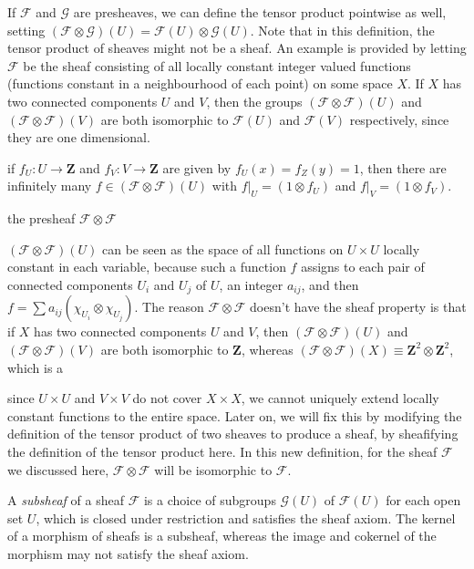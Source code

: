 \begin{example}
    If $\mathcal{F}$ and $\mathcal{G}$ are presheaves, we can define the tensor product pointwise as well, setting $(\mathcal{F} \otimes \mathcal{G})(U) = \mathcal{F}(U) \otimes \mathcal{G}(U)$. Note that in this definition, the tensor product of sheaves might not be a sheaf. An example is provided by letting $\mathcal{F}$ be the sheaf consisting of all locally constant integer valued functions (functions constant in a neighbourhood of each point) on some space $X$. If $X$ has two connected components $U$ and $V$, then the groups $(\mathcal{F} \otimes \mathcal{F})(U)$ and $(\mathcal{F} \otimes \mathcal{F})(V)$ are both isomorphic to $\mathcal{F}(U)$ and $\mathcal{F}(V)$ respectively, since they are one dimensional.

    if $f_U: U \to \mathbf{Z}$ and $f_V: V \to \mathbf{Z}$ are given by $f_U(x) = f_Z(y) = 1$, then there are infinitely many $f \in (\mathcal{F} \otimes \mathcal{F})(U)$ with $f|_U = (1 \otimes f_U)$ and $f|_V = (1 \otimes f_V)$.

    the presheaf $\mathcal{F} \otimes \mathcal{F}$

    $(\mathcal{F} \otimes \mathcal{F})(U)$ can be seen as the space of all functions on $U \times U$ locally constant in each variable, because such a function $f$ assigns to each pair of connected components $U_i$ and $U_j$ of $U$, an integer $a_{ij}$, and then $f = \sum a_{ij} (\chi_{U_i} \otimes \chi_{U_j})$. The reason $\mathcal{F} \otimes \mathcal{F}$ doesn't have the sheaf property is that if $X$ has two connected components $U$ and $V$, then $(\mathcal{F} \otimes \mathcal{F})(U)$ and $(\mathcal{F} \otimes \mathcal{F})(V)$ are both isomorphic to $\mathbf{Z}$, whereas $(\mathcal{F} \otimes \mathcal{F})(X) \equiv \mathbf{Z}^2 \otimes \mathbf{Z}^2$, which is a 

    since $U \times U$ and $V \times V$ do not cover $X \times X$, we cannot uniquely extend locally constant functions to the entire space. Later on, we will fix this by modifying the definition of the tensor product of two sheaves to produce a sheaf, by sheafifying the definition of the tensor product here. In this new definition, for the sheaf $\mathcal{F}$ we discussed here, $\mathcal{F} \otimes \mathcal{F}$ will be isomorphic to $\mathcal{F}$.
\end{example}

A \emph{subsheaf} of a sheaf $\mathcal{F}$ is a choice of subgroups $\mathcal{G}(U)$ of $\mathcal{F}(U)$ for each open set $U$, which is closed under restriction and satisfies the sheaf axiom. The kernel of a morphism of sheafs is a subsheaf, whereas the image and cokernel of the morphism may not satisfy the sheaf axiom.

